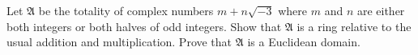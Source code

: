 Let $\mathfrak{A}$ be the totality of complex numbers $m + n\sqrt{-3}$ where $m$ and $n$ are either both integers or both halves of odd integers. Show that $\mathfrak{A}$ is a ring relative to the usual addition and multiplication. Prove that $\mathfrak{A}$ is a Euclidean domain.